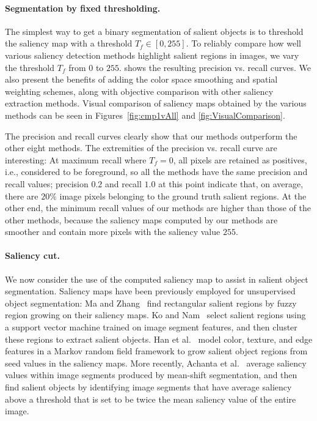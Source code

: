 \documentclass[final]{cvpr}
\newcommand{\vnudge}{\vspace*{-.1in}}
\newcommand{\mypara}[1]{\paragraph{#1.}}
\begin{document}
\vnudge
\mypara{Segmentation by fixed thresholding}
The simplest way to get a binary segmentation of salient objects is to
threshold the saliency map with a threshold $T_f \in [0, 255]$.
%
To reliably compare how well various saliency detection methods highlight salient regions in images,
we vary the threshold $T_f$ from $0$ to $255$.  shows the resulting precision vs. recall curves.
%
We also present the  benefits of adding the color space smoothing and spatial weighting
schemes, along with objective comparison with other saliency extraction methods.
%
Visual comparison of saliency maps obtained by the various methods can be seen in
Figures~\ref{fig:cmp1vAll} and \ref{fig:VisualComparison}. %


The precision and recall curves clearly show that our methods outperform the other eight methods.
%
The extremities of the precision vs. recall curve are interesting: At maximum recall
where $T_f = 0$, all pixels are retained as positives, i.e., considered to be
foreground, so all the methods have the same precision and recall values; precision
$0.2$ and recall $1.0$ at this point indicate that, on average, there are $20\%$ image
pixels belonging to the ground truth salient regions.
%
At the other end, the minimum recall values of our methods are higher than those of the other
methods, because the saliency maps computed by our methods are smoother and contain more
pixels with the saliency value $255$.



\vnudge
\mypara{Saliency cut}
We now consider the use of the computed saliency map to assist in salient object segmentation.
%
Saliency maps have been previously employed for unsupervised object segmentation:
%
Ma and Zhang~\cite{03ACMMM/Ma_Contrast-based} find rectangular salient regions
by fuzzy region growing on their saliency maps.
%
Ko and Nam~\cite{06josa/KoN_InterestSegmentation} select salient regions using a support
vector machine trained on image segment features, and then cluster these
regions to extract salient objects.
%
Han et al.~\cite{06TCSVT/han_unsupervised} model color, texture, and edge features in a Markov
random field framework to grow salient object regions from seed values in the saliency maps.
%
More recently, Achanta et al.~\cite{09cvpr/Achanta_FTSaliency} average saliency values within
image segments produced by mean-shift segmentation, and then find salient objects by identifying
image segments that have average saliency above a threshold that is set to be twice the mean
saliency value of the entire image.
\end{document}
